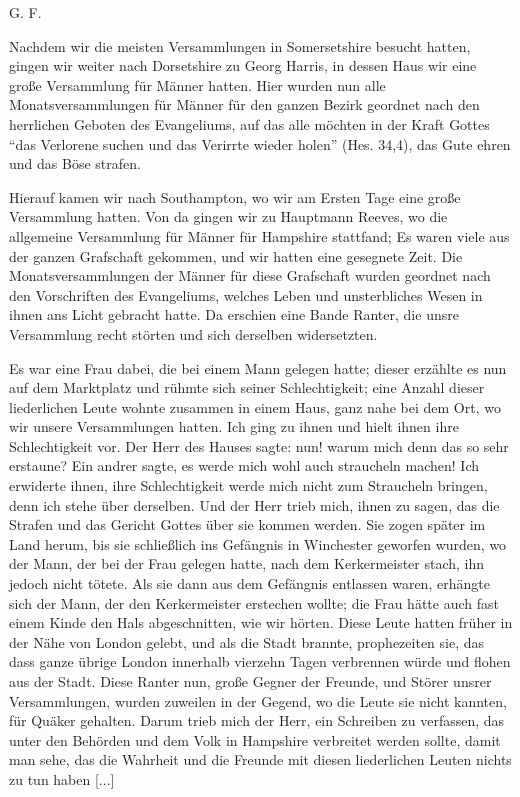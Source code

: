 \begin{flushright}G. F.\end{flushright}


Nachdem wir die meisten Versammlungen in Somersetshire
besucht hatten, gingen wir weiter nach Dorsetshire 
zu Georg Harris,
in dessen Haus wir eine große Versammlung für Männer hatten.
Hier wurden nun alle Monatsversammlungen für Männer für
den ganzen Bezirk geordnet nach den herrlichen Geboten des
Evangeliums, auf das alle möchten in der Kraft Gottes "`das
Verlorene suchen und das Verirrte wieder holen"' (Hes. 34,4),
das Gute ehren und das Böse strafen.

Hierauf kamen wir nach Southampton, wo wir am Ersten
Tage eine große Versammlung hatten. Von da gingen wir zu
Hauptmann Reeves, 
wo die allgemeine Versammlung für Männer
für Hampshire stattfand; Es waren viele aus der ganzen Grafschaft 
gekommen, und wir hatten eine gesegnete Zeit. Die Monatsversammlungen 
der Männer für diese Grafschaft wurden geordnet
nach den Vorschriften des Evangeliums, welches Leben und
unsterbliches Wesen in ihnen ans Licht gebracht hatte. Da erschien
eine Bande Ranter, die unsre Versammlung recht störten und
sich derselben widersetzten.

Es war eine Frau dabei, die bei einem Mann gelegen hatte;
dieser erzählte es nun auf dem Marktplatz und rühmte sich
seiner Schlechtigkeit; eine Anzahl dieser liederlichen Leute wohnte
zusammen in einem Haus, ganz nahe bei dem Ort, wo wir unsere
Versammlungen hatten. Ich ging zu ihnen und hielt ihnen ihre
Schlechtigkeit vor. Der Herr des Hauses sagte: nun! warum mich
denn das so sehr erstaune? Ein andrer sagte, es werde mich
wohl auch straucheln machen! Ich erwiderte ihnen, ihre
Schlechtigkeit werde mich nicht zum Straucheln bringen, denn ich stehe
über derselben. Und der Herr trieb mich, ihnen zu sagen, das
die Strafen und das Gericht Gottes über sie kommen werden.
Sie zogen später im Land herum, bis sie schließlich ins Gefängnis
in Winchester geworfen wurden, wo der Mann, der bei der Frau
gelegen hatte, nach dem Kerkermeister stach, ihn jedoch nicht tötete.
Als sie dann aus dem Gefängnis entlassen waren, erhängte sich
der Mann, der den Kerkermeister erstechen wollte; die Frau hätte
auch fast einem Kinde den Hals abgeschnitten, wie wir hörten.
Diese Leute hatten früher in der Nähe von London gelebt, und als
die Stadt brannte, prophezeiten sie, das dass ganze übrige London
innerhalb vierzehn Tagen verbrennen würde und flohen aus der
Stadt. Diese Ranter nun, große Gegner der Freunde, und Störer
unsrer Versammlungen, wurden zuweilen in der Gegend, wo die
Leute sie nicht kannten, für Quäker gehalten. Darum trieb mich
der Herr, ein Schreiben zu verfassen, das unter den Behörden
und dem Volk in Hampshire verbreitet werden sollte, damit man
sehe, das die Wahrheit und die Freunde mit diesen liederlichen
Leuten nichts zu tun haben [...]

